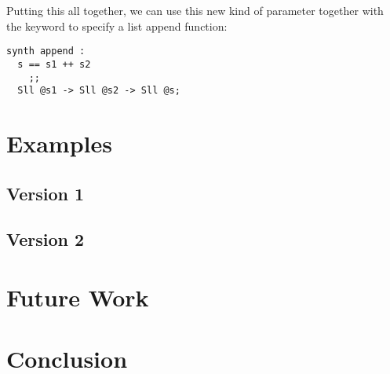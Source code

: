 \documentclass[acmsmall]{acmart}
\begin{document}
\noindent
Putting this all together, we can use this new kind of parameter together with the \synth{} keyword to specify a list append function:

\begin{lstlisting}
synth append :
  s == s1 ++ s2
    ;;
  Sll @s1 -> Sll @s2 -> Sll @s;
\end{lstlisting}

\section{Examples}
\label{sec:examples}

\subsection{Version 1}

\subsection{Version 2}

\section{Future Work}
\label{sec:future-work}

\section{Conclusion}
\label{sec:conclusion}
\end{document}
